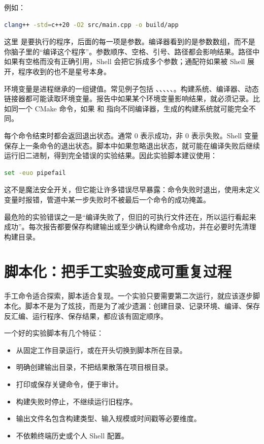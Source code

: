 例如：

\begin{lstlisting}[language=bash]
clang++ -std=c++20 -O2 src/main.cpp -o build/app
\end{lstlisting}

这里  是要执行的程序，后面的每一项是参数。编译器看到的是参数数组，而不是你脑子里的“编译这个程序”。参数顺序、空格、引号、路径都会影响结果。路径中如果有空格而没有正确引用，Shell 会把它拆成多个参数；通配符如果被 Shell 展开，程序收到的也不是星号本身。

环境变量是进程继承的一组键值。常见例子包括 、、、、、。构建系统、编译器、动态链接器都可能读取环境变量。报告中如果某个环境变量影响结果，就必须记录。比如同一个 CMake 命令，如果  和  指向不同编译器，生成的构建系统就可能完全不同。

每个命令结束时都会返回退出状态。通常 0 表示成功，非 0 表示失败。Shell 变量  保存上一条命令的退出状态。脚本中如果忽略退出状态，就可能在编译失败后继续运行旧二进制，得到完全错误的实验结果。因此实验脚本建议使用：

\begin{lstlisting}[language=bash]
set -euo pipefail
\end{lstlisting}

这不是魔法安全开关，但它能让许多错误尽早暴露：命令失败时退出，使用未定义变量时报错，管道中某一步失败时不被最后一个命令的成功掩盖。

\begin{warningbox}
最危险的实验错误之一是“编译失败了，但旧的可执行文件还在，所以运行看起来成功”。每次报告都要保存构建输出或至少确认构建命令成功，并在必要时先清理构建目录。
\end{warningbox}

\section{脚本化：把手工实验变成可重复过程}

手工命令适合探索，脚本适合复现。一个实验只要需要第二次运行，就应该逐步脚本化。脚本不是为了炫技，而是为了减少遗漏：创建目录、记录环境、编译、保存反汇编、运行程序、保存结果，都应该有固定顺序。

一个好的实验脚本有几个特征：

\begin{itemize}
  \item 从固定工作目录运行，或在开头切换到脚本所在目录。
  \item 明确创建输出目录，不把结果散落在项目根目录。
  \item 打印或保存关键命令，便于审计。
  \item 构建失败时停止，不继续运行旧程序。
  \item 输出文件名包含构建类型、输入规模或时间戳等必要维度。
  \item 不依赖终端历史或个人 Shell 配置。
\end{itemize}

